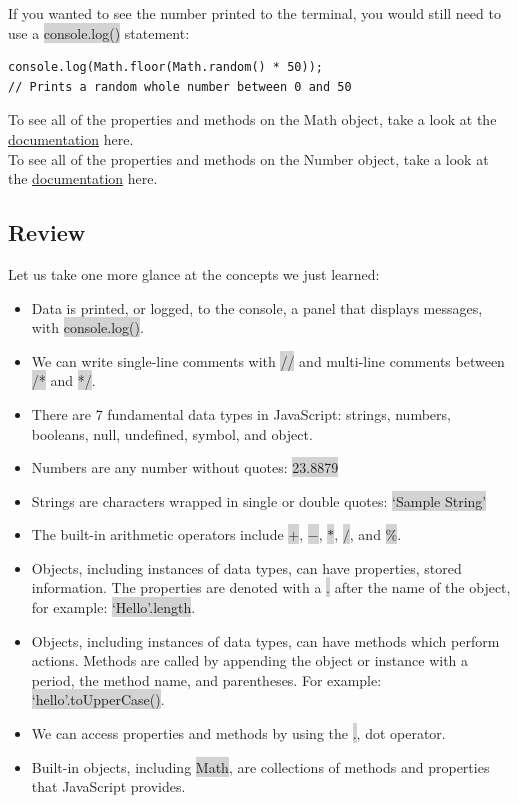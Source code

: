 \documentclass[11pt]{article}
\begin{document}
If you wanted to see the number printed to the terminal, you would still need to use a \colorbox{lightgray}{console.log()} statement:
\begin{lstlisting}
console.log(Math.floor(Math.random() * 50)); 
// Prints a random whole number between 0 and 50
\end{lstlisting}
To see all of the properties and methods on the Math object, take a look at the \href{https://developer.mozilla.org/en-US/docs/Web/JavaScript/Reference/Global_Objects/Math}{documentation} here. \\
To see all of the properties and methods on the Number object, take a look at the \href{https://developer.mozilla.org/en-US/docs/Web/JavaScript/Reference/Global_Objects/Number}{documentation} here. 
\subsection{Review}
Let us take one more glance at the concepts we just learned:
\begin{itemize}[leftmargin = *]
\item Data is printed, or logged, to the console, a panel that displays messages, with \colorbox{lightgray}{console.log()}.
\item We can write single-line comments with \colorbox{lightgray}{//} and multi-line comments between \colorbox{lightgray}{/*} and \colorbox{lightgray}{*/}.
\item There are 7 fundamental data types in JavaScript: strings, numbers, booleans, null, undefined, symbol, and object.
\item Numbers are any number without quotes: \colorbox{lightgray}{23.8879}
\item Strings are characters wrapped in single or double quotes: \colorbox{lightgray}{`Sample String'}
\item The built-in arithmetic operators include \colorbox{lightgray}{$+$}, \colorbox{lightgray}{$-$}, \colorbox{lightgray}{$*$}, \colorbox{lightgray}{$/$}, and \colorbox{lightgray}{$\%$}.
\item Objects, including instances of data types, can have properties, stored information. The properties are denoted with a \colorbox{lightgray}{.} after the name of the object, for example: \colorbox{lightgray}{`Hello'.length}.
\item Objects, including instances of data types, can have methods which perform actions. Methods are called by appending the object or instance with a period, the method name, and parentheses. For example: \colorbox{lightgray}{`hello'.toUpperCase()}.
\item We can access properties and methods by using the \colorbox{lightgray}{.}, dot operator.
\item Built-in objects, including \colorbox{lightgray}{Math}, are collections of methods and properties that JavaScript provides.
\end{itemize}
\end{document}
